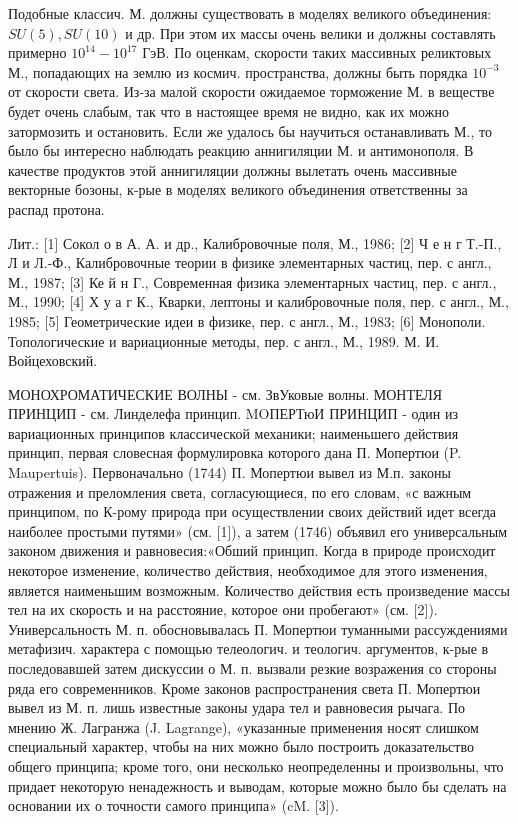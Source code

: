 \documentclass[10pt]{article}
\begin{document}
Подобные классич. М. должны существовать в моделях великого объединения: $S U(5), S U(10)$ и др. При этом их массы очень велики и должны составлять примерно $10^{14}-10^{17}$ ГэВ. По оценкам, скорости таких массивных реликтовых М., попадающих на землю из космич. пространства, должны быть порядка $10^{-3}$ от скорости света. Из-за малой скорости ожидаемое торможение М. в веществе будет очень слабым, так что в настоящее время не видно, как их можно затормозить и остановить. Если же удалось бы научиться останавливать М., то было бы интересно наблюдать реакцию аннигиляции М. и антимонополя. В качестве продуктов этой аннигиляции должны вылетать очень массивные векторные бозоны, к-рые в моделях великого объединения ответственны за распад протона.



Лит.: [1] Сокол о в А. А. и др., Калибровочные поля, М., 1986; [2] Ч е н г Т.-П., Л и Л.-Ф., Калибровочные теории в физике элементарных частиц, пер. с англ., М., 1987; [3] Ке й н Г., Современная физика элементарных частиц, пер. с англ., М., 1990; [4] Х у а г К., Кварки, лептоны и калибровочные поля, пер. с англ., М., 1985; [5] Геометрические идеи в физике, пер. с англ., М., 1983; [6] Монополи. Топологические и вариационные методы, пер. с англ., М., 1989. М. И. Войцеховский.



МОНОХРОМАТИЧЕСКИЕ ВОЛНЫ - см. ЗвУковые волны. МОНТЕЛЯ ПРИНЦИП - см. Линделефа принцип. MOПЕРТюИ ПРИНЦИП - один из вариационных принципов классической механики; наименьшего действия принцип, первая словесная формулировка которого дана П. Мопертюи (P. Maupertuis). Первоначально (1744) П. Мопертюи вывел из М.п. законы отражения и преломления света, согласующиеся, по его словам, «с важным принципом, по К-рому природа при осуществлении своих действий идет всегда наиболее простыми путями» (см. [1]), а затем (1746) объявил его универсальным законом движения и равновесия:«Обший принцип. Когда в природе происходит некоторое изменение, количество действия, необходимое для этого изменения, является наименьшим возможным. Количество действия есть произведение массы тел на их скорость и на расстояние, которое они пробегают» (см. [2]). Универсальность М. п. обосновывалась П. Мопертюи туманными рассуждениями метафизич. характера с помощью телеологич. и теологич. аргументов, к-рые в последовавшей затем дискуссии о М. п. вызвали резкие возражения со стороны ряда его современников. Кроме законов распространения света П. Мопертюи вывел из М. п. лишь известные законы удара тел и равновесия рычага. По мнению Ж. Лагранжа (J. Lagrange), «указанные применения носят слишком специальный характер, чтобы на них можно было построить доказательство общего принципа; кроме того, они несколько неопределенны и произвольны, что придает некоторую ненадежность и выводам, которые можно было бы сделать на основании их о точности самого принципа» (cM. [3]).
\end{document}
